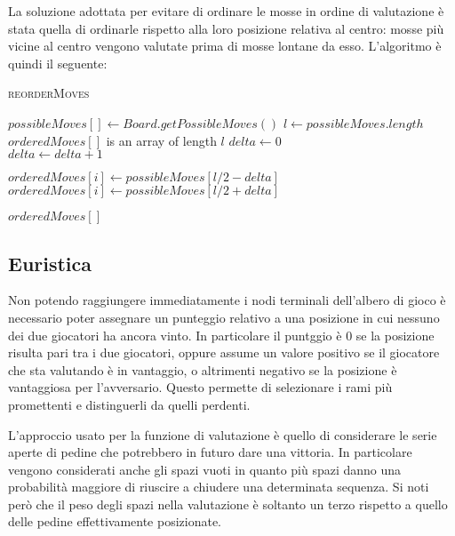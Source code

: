 \documentclass[a4paper]{article}
\begin{document}
La soluzione adottata per evitare di ordinare le mosse in ordine di valutazione
è stata quella di ordinarle rispetto alla loro posizione relativa al centro: 
mosse più vicine al centro vengono valutate prima di mosse lontane da esso.
L'algoritmo è quindi il seguente:

\begin{algorithm}
  \caption{\textsc{reorderMoves}}
 \begin{algorithmic}
   \State $possibleMoves[] \gets Board.getPossibleMoves()$
     \State $l \gets possibleMoves.length$
     \State $orderedMoves[]$ is an array of length $l$
     \State $delta \gets 0$
     \\
         \State $delta \gets delta + 1$

         \State $orderedMoves[i] \gets possibleMoves[l / 2 - delta]$
       \Else
         \State $orderedMoves[i] \gets possibleMoves[l / 2 + delta]$
       \EndIf
     \EndFor

     \State \Return $orderedMoves[]$
   \EndFunction
 \end{algorithmic} 
\end{algorithm}

\subsection{Euristica}
Non potendo raggiungere immediatamente i nodi terminali dell'albero di gioco è
necessario poter assegnare un punteggio relativo a una posizione in cui nessuno
dei due giocatori ha ancora vinto. In particolare il puntggio è 0 se la 
posizione risulta pari tra i due giocatori, oppure assume un valore positivo se
il giocatore che sta valutando è in vantaggio, o altrimenti negativo se la 
posizione è vantaggiosa per l'avversario. Questo permette di selezionare i rami
più promettenti e distinguerli da quelli perdenti.

L'approccio usato per la funzione di valutazione è quello di considerare 
le serie aperte di pedine che potrebbero in futuro dare una vittoria. In 
particolare vengono considerati anche gli spazi vuoti in quanto più spazi danno
una probabilità maggiore di riuscire a chiudere una determinata sequenza. Si 
noti però che il peso degli spazi nella valutazione è soltanto un terzo rispetto
a quello delle pedine effettivamente posizionate.
\end{document}
